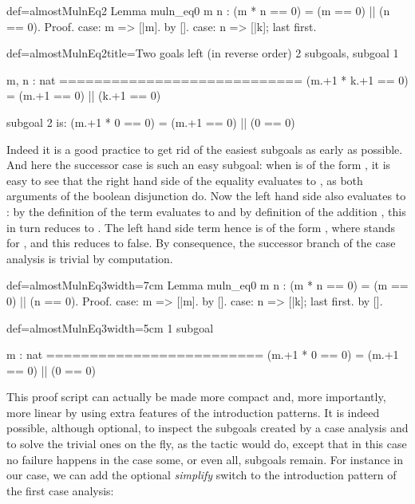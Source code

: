 \begin{coq}{def=almostMulnEq2}{}
Lemma muln_eq0 m n : (m * n == 0) = (m == 0) || (n == 0).
Proof.
case: m => [|m].
  by [].
case: n => [|k]; last first.
\end{coq}
\begin{coqout}{def=almostMulnEq2}{title=Two goals left (in reverse order)}
2 subgoals, subgoal 1

m, n : nat
============================
(m.+1 * k.+1 == 0) = (m.+1 == 0) || (k.+1 == 0)

subgoal 2 is:
 (m.+1 * 0 == 0) = (m.+1 == 0) || (0 == 0)
\end{coqout}
Indeed it is a good practice to get rid of the easiest subgoals as
early as possible. And here the successor case is such an easy
subgoal: when  is of the form , it is easy to see that the
right hand side of the equality evaluates to , as both
arguments of the boolean disjunction do. Now the left hand side also
evaluates to : by the definition of  the term
 evaluates to  and by
definition of the addition , this in turn reduces to
. The left hand side term hence is of the form
, where  stands for , and this
reduces to false.\label{proof:mulneq0}
By consequence, the successor branch of the case analysis is trivial
by computation.


\begin{coq}{def=almostMulnEq3}{width=7cm}
Lemma muln_eq0 m n :
  (m * n == 0) = (m == 0) || (n == 0).
Proof.
case: m => [|m].
  by [].
case: n => [|k]; last first.
  by [].
\end{coq}
\begin{coqout}{def=almostMulnEq3}{width=5cm}
1 subgoal

m : nat
=========================
(m.+1 * 0 == 0) =
  (m.+1 == 0) || (0 == 0)
\end{coqout}

This proof script can actually be made more compact and, more
importantly, more linear by using extra features of the introduction
patterns. It is indeed possible, although optional, to
inspect the subgoals created by a case analysis and to solve the
trivial ones on the fly, as the  tactic would do, except that
in this case no failure happens in the case some, or even all,
subgoals remain. For instance in our case,
we can add the optional \C{//} \emph{simplify} switch to the
introduction pattern of the first case analysis:

